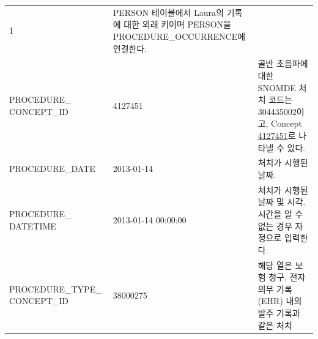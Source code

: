 \documentclass[11pt]{book}
\theoremstyle{definition}
\theoremstyle{definition}
\theoremstyle{definition}
\theoremstyle{remark}
\begin{document}
\begin{longtable}[]{@{}lll@{}}
\begin{minipage}[t]{0.16\columnwidth}
1\strut
\end{minipage} & \begin{minipage}[t]{0.48\columnwidth}\raggedright\strut
PERSON 테이블에서 Laura의 기록에 대한 외래 키이며 PERSON을
PROCEDURE\_OCCURRENCE에 연결한다.\strut
\end{minipage}\tabularnewline
\begin{minipage}[t]{0.28\columnwidth}\raggedright\strut
PROCEDURE\_ CONCEPT\_ID\strut
\end{minipage} & \begin{minipage}[t]{0.16\columnwidth}\raggedright\strut
4127451\strut
\end{minipage} & \begin{minipage}[t]{0.48\columnwidth}\raggedright\strut
골반 초음파에 대한 SNOMDE 처치 코드는 304435002이고, Concept
\href{http://athena.ohdsi.org/search-terms/terms/4127451}{4127451}로
나타낼 수 있다.\strut
\end{minipage}\tabularnewline
\begin{minipage}[t]{0.28\columnwidth}\raggedright\strut
PROCEDURE\_DATE\strut
\end{minipage} & \begin{minipage}[t]{0.16\columnwidth}\raggedright\strut
2013-01-14\strut
\end{minipage} & \begin{minipage}[t]{0.48\columnwidth}\raggedright\strut
처치가 시행된 날짜.\strut
\end{minipage}\tabularnewline
\begin{minipage}[t]{0.28\columnwidth}\raggedright\strut
PROCEDURE\_ DATETIME\strut
\end{minipage} & \begin{minipage}[t]{0.16\columnwidth}\raggedright\strut
2013-01-14 00:00:00\strut
\end{minipage} & \begin{minipage}[t]{0.48\columnwidth}\raggedright\strut
처치가 시행된 날짜 및 시각. 시간을 알 수 없는 경우 자정으로
입력한다.\strut
\end{minipage}\tabularnewline
\begin{minipage}[t]{0.28\columnwidth}\raggedright\strut
PROCEDURE\_TYPE\_ CONCEPT\_ID\strut
\end{minipage} & \begin{minipage}[t]{0.16\columnwidth}\raggedright\strut
38000275\strut
\end{minipage} & \begin{minipage}[t]{0.48\columnwidth}\raggedright\strut
해당 열은 보험 청구, 전자 의무 기록(EHR) 내의 발주 기록과 같은 처치

\end{minipage}
\end{longtable}
\end{document}
